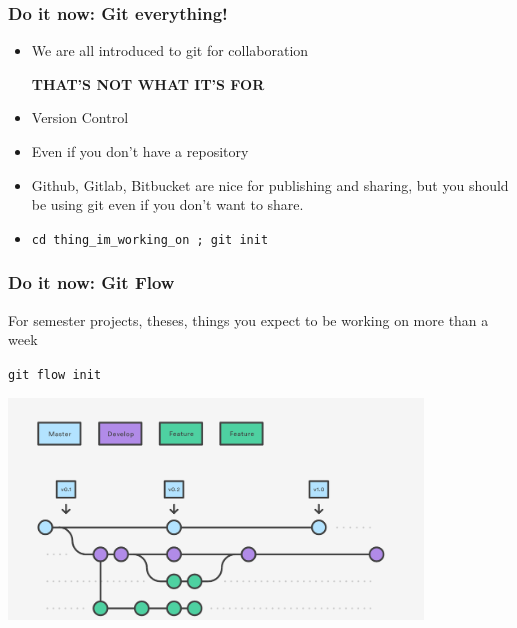 \documentclass[10pt]{beamer}
\begin{document}
\begin{frame}[c]\frametitle{Do it now: Git everything!}

\begin{itemize}[<+->]
	\item We are all introduced to git for collaboration

	\pause

	\alert{\textbf{THAT'S NOT WHAT IT'S FOR}}

	\item Version Control

	\item Even if you don't have a repository

	\item Github, Gitlab, Bitbucket are nice for publishing and sharing, but you should be using git even if you don't want to share.

	\item \texttt{cd thing\_im\_working\_on ; git init}

\end{itemize}

\end{frame}

\begin{frame}[c]\frametitle{Do it now: Git Flow}
    For semester projects, theses, things you expect to be working on more than a week

    \pause

    \texttt{git flow init}

    \pause

    \centerline{\includegraphics[width=11cm]{figs/gitflow.png}}


\end{frame}
\end{document}
